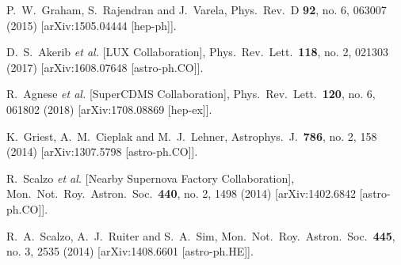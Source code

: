   P.~W.~Graham, S.~Rajendran and J.~Varela,
  Phys.\ Rev.\ D {\bf 92}, no. 6, 063007 (2015)
  [arXiv:1505.04444 [hep-ph]].


  D.~S.~Akerib {\it et al.} [LUX Collaboration],
  Phys.\ Rev.\ Lett.\  {\bf 118}, no. 2, 021303 (2017)
  [arXiv:1608.07648 [astro-ph.CO]].


  R.~Agnese {\it et al.} [SuperCDMS Collaboration],
  Phys.\ Rev.\ Lett.\  {\bf 120}, no. 6, 061802 (2018)
  [arXiv:1708.08869 [hep-ex]].


  K.~Griest, A.~M.~Cieplak and M.~J.~Lehner,
  Astrophys.\ J.\  {\bf 786}, no. 2, 158 (2014)
  [arXiv:1307.5798 [astro-ph.CO]].


  R.~Scalzo {\it et al.} [Nearby Supernova Factory Collaboration],
  Mon.\ Not.\ Roy.\ Astron.\ Soc.\  {\bf 440}, no. 2, 1498 (2014)
  [arXiv:1402.6842 [astro-ph.CO]].


  R.~A.~Scalzo, A.~J.~Ruiter and S.~A.~Sim,
  Mon.\ Not.\ Roy.\ Astron.\ Soc.\  {\bf 445}, no. 3, 2535 (2014)
  [arXiv:1408.6601 [astro-ph.HE]].



